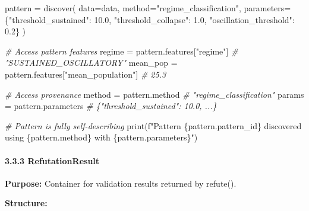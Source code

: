 \documentclass[
]{article}
\newenvironment{Shaded}{}{}
\newcommand{\BuiltInTok}[1]{\textcolor[rgb]{0.00,0.50,0.00}{#1}}
\newcommand{\CommentTok}[1]{\textcolor[rgb]{0.38,0.63,0.69}{\textit{#1}}}
\newcommand{\FloatTok}[1]{\textcolor[rgb]{0.25,0.63,0.44}{#1}}
\newcommand{\NormalTok}[1]{#1}
\newcommand{\OperatorTok}[1]{\textcolor[rgb]{0.40,0.40,0.40}{#1}}
\newcommand{\SpecialCharTok}[1]{\textcolor[rgb]{0.25,0.44,0.63}{#1}}
\newcommand{\SpecialStringTok}[1]{\textcolor[rgb]{0.73,0.40,0.53}{#1}}
\newcommand{\StringTok}[1]{\textcolor[rgb]{0.25,0.44,0.63}{#1}}
\begin{document}
\begin{Shaded}
\begin{Highlighting}[]
\NormalTok{pattern }\OperatorTok{=}\NormalTok{ discover(}
\NormalTok{    data}\OperatorTok{=}\NormalTok{data,}
\NormalTok{    method}\OperatorTok{=}\StringTok{"regime\_classification"}\NormalTok{,}
\NormalTok{    parameters}\OperatorTok{=}\NormalTok{\{}\StringTok{"threshold\_sustained"}\NormalTok{: }\FloatTok{10.0}\NormalTok{, }\StringTok{"threshold\_collapse"}\NormalTok{: }\FloatTok{1.0}\NormalTok{, }\StringTok{"oscillation\_threshold"}\NormalTok{: }\FloatTok{0.2}\NormalTok{\}}
\NormalTok{)}

\CommentTok{\# Access pattern features}
\NormalTok{regime }\OperatorTok{=}\NormalTok{ pattern.features[}\StringTok{"regime"}\NormalTok{]              }\CommentTok{\# "SUSTAINED\_OSCILLATORY"}
\NormalTok{mean\_pop }\OperatorTok{=}\NormalTok{ pattern.features[}\StringTok{"mean\_population"}\NormalTok{]  }\CommentTok{\# 25.3}

\CommentTok{\# Access provenance}
\NormalTok{method }\OperatorTok{=}\NormalTok{ pattern.method                         }\CommentTok{\# "regime\_classification"}
\NormalTok{params }\OperatorTok{=}\NormalTok{ pattern.parameters                     }\CommentTok{\# \{"threshold\_sustained": 10.0, ...\}}

\CommentTok{\# Pattern is fully self{-}describing}
\BuiltInTok{print}\NormalTok{(}\SpecialStringTok{f"Pattern }\SpecialCharTok{\{}\NormalTok{pattern}\SpecialCharTok{.}\NormalTok{pattern\_id}\SpecialCharTok{\}}\SpecialStringTok{ discovered using }\SpecialCharTok{\{}\NormalTok{pattern}\SpecialCharTok{.}\NormalTok{method}\SpecialCharTok{\}}\SpecialStringTok{ with }\SpecialCharTok{\{}\NormalTok{pattern}\SpecialCharTok{.}\NormalTok{parameters}\SpecialCharTok{\}}\SpecialStringTok{"}\NormalTok{)}
\end{Highlighting}
\end{Shaded}

\paragraph{3.3.3 RefutationResult}\label{refutationresult}

\textbf{Purpose:} Container for validation results returned by refute().

\textbf{Structure:}
\end{document}
